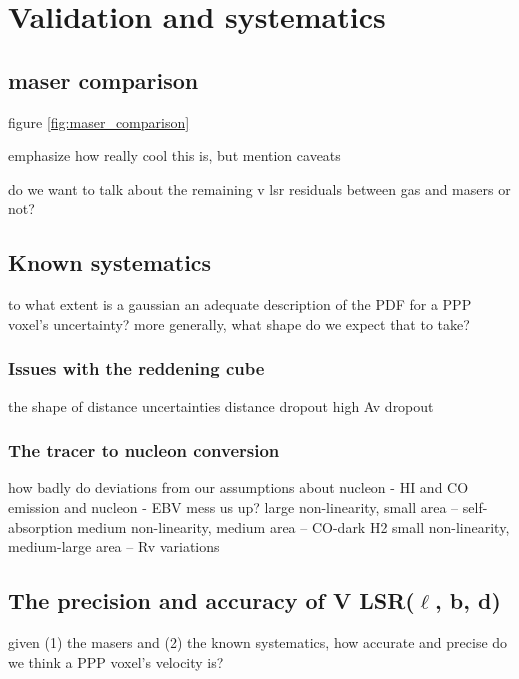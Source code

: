 \section{Validation and systematics}
\label{sec:validation}
\subsection{\citet{2009ApJ...700..137R} maser comparison}
figure \ref{fig:maser_comparison}

emphasize how really cool this is, but mention caveats

do we want to talk about the remaining v lsr residuals between gas and masers or not?

\subsection{Known systematics}
to what extent is a gaussian an adequate description of the PDF for a PPP voxel's uncertainty? more generally, what shape do we expect that to take?

\subsubsection{Issues with the reddening cube}
the shape of distance uncertainties
distance dropout
high Av dropout

\subsubsection{The tracer to nucleon conversion}
how badly do deviations from our assumptions about nucleon - HI and CO emission and nucleon - EBV mess us up?
large non-linearity, small area -- self-absorption
medium non-linearity, medium area -- CO-dark H2
small non-linearity, medium-large area -- Rv variations

\subsection{The precision and accuracy of V LSR($\ell$, b, d)}
given (1) the masers and (2) the known systematics, how accurate and precise do we think a PPP voxel's velocity is?